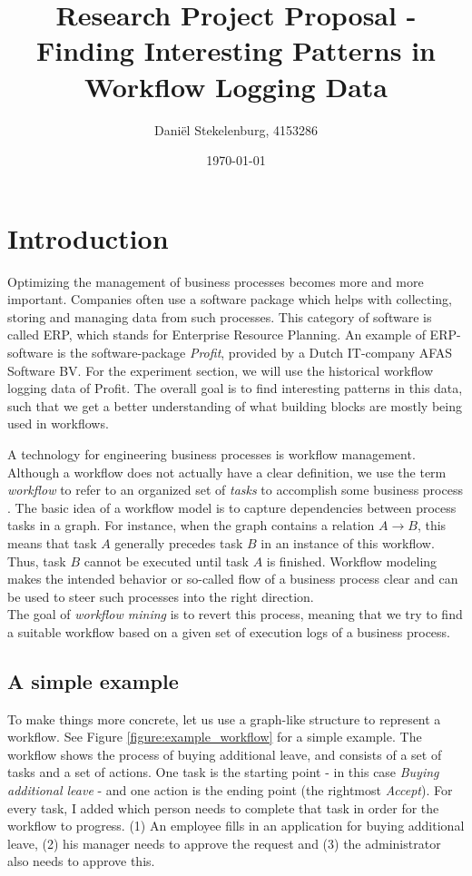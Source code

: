 \documentclass[a4paper,11pt]{article}
\begin{document}
\title{Research Project Proposal - Finding Interesting Patterns in Workflow Logging Data}
\date{\today}
\author{
        Dani\"el Stekelenburg, 4153286		
}
 
\maketitle

\abstract{}

\section{Introduction}
Optimizing the management of business processes becomes more and more important. Companies often use a software package which helps with collecting, storing and managing data from such processes. This category of software is called ERP, which stands for Enterprise Resource Planning. An example of ERP-software is the software-package \textit{Profit}, provided by a Dutch IT-company AFAS Software BV. For the experiment section, we will use the historical workflow logging data of Profit. The overall goal is to find interesting patterns in this data, such that we get a better understanding of what building blocks are mostly being used in workflows.

A technology for engineering business processes is workflow management. Although a workflow does not actually have a clear definition, we use the term \textit{workflow} to refer to an organized set of \textit{tasks} to accomplish some business process \cite{Georgakopoulos1995}. The basic idea of a workflow model is to capture dependencies between process tasks in a graph. For instance, when the graph contains a relation $A \rightarrow B$, this means that task $A$ generally precedes task $B$ in an instance of this workflow. Thus, task $B$ cannot be executed until task $A$ is finished. Workflow modeling makes the intended behavior or so-called flow of a business process clear and can be used to steer such processes into the right direction.\\
The goal of \textit{workflow mining} is to revert this process, meaning that we try to find a suitable workflow based on a given set of execution logs of a business process.

\subsection{A simple example}
To make things more concrete, let us use a graph-like structure to represent a workflow. See Figure \ref{figure:example_workflow} for a simple example. The workflow shows the process of buying additional leave, and consists of a set of tasks and a set of actions. One task is the starting point - in this case \textit{Buying additional leave} - and one action is the ending point (the rightmost \textit{Accept}). For every task, I added which person needs to complete that task in order for the workflow to progress. (1) An employee fills in an application for buying additional leave, (2) his manager needs to approve the request and (3) the administrator also needs to approve this. 
\end{document}

